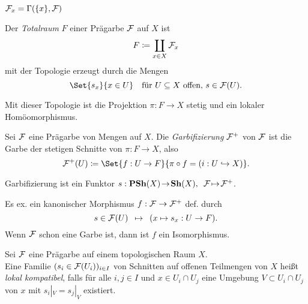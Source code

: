 \documentclass{cheat-sheet}
\begin{document}
\begin{beob}
  $\mathcal{F}_x = \Gamma(\{x\}, \mathcal{F})$
\end{beob}

\begin{defn}
  Der \emph{Totalraum} $F$ einer Prägarbe $\mathcal{F}$ auf $X$ ist
  \[ F \coloneqq \coprod_{x \in X} \mathcal{F}_x \]
  mit der Topologie erzeugt durch die Mengen
  \[
    \Set{s_x}{ x \in U } \quad
    \text{für $U \subseteq X$ offen, $s \in \Fais(U)$.}
  \]
\end{defn}

\begin{bem}
  Mit dieser Topologie ist die Projektion $\pi : F \to X$ stetig und ein lokaler Homöomorphismus.
\end{bem}

\begin{defn}
  Sei $\mathcal{F}$ eine Prägarbe von Mengen auf $X$. Die \emph{Garbifizierung} $\mathcal{F}^+$ von $\mathcal{F}$ ist die Garbe der stetigen Schnitte von $\pi : F \to X$, also
  \[ \Fais^+(U) \coloneqq \Set{f : U \to F}{\pi \circ f = (i : U \hookrightarrow X)}. \]
\end{defn}

\begin{bem}
  Garbifizierung ist ein Funktor $s : \mathbf{PSh}(X) \!\to\! \mathbf{Sh}(X), \enspace \mathcal{F} \!\mapsto\! \mathcal{F}^+$.
\end{bem}

\begin{prop}
  Es ex. ein kanonischer Morphismus $f : \mathcal{F} \to \mathcal{F}^+$ def. durch
  \[ s \in \mathcal{F}(U) \enspace \mapsto \enspace (x \mapsto s_x : U \to F). \]
  Wenn $\mathcal{F}$ schon eine Garbe ist, dann ist $f$ ein Isomorphismus.
\end{prop}

\begin{defn}
  Sei $\mathcal{F}$ eine Prägarbe auf einem topologischen Raum $X$. \\
  Eine Familie $(s_i \in \mathcal{F}(U_i))_{i \in I}$ von Schnitten auf offenen Teilmengen von $X$ heißt \emph{lokal kompatibel}, falls für alle $i, j \in I$ und $x \in U_i \cap U_j$ eine Umgebung $V \subset U_i \cap U_j$ von $x$ mit $s_i|_V = s_j|_V$ existiert.
\end{defn}
\end{document}
